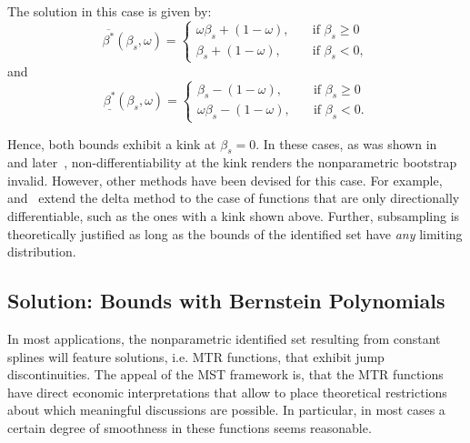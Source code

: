 \documentclass[12pt,a4paper,english]{article} %
\numberwithin{equation}{section}
\theoremstyle{definition}
\theoremstyle{remark}
\theoremstyle{plain}
\begin{document}
The solution in this case is given by:
\begin{equation}\label{eq:solution_cs_increasing_mtr_upper}
	\overline{\beta^*}(\beta_s, \omega)=
	\begin{cases}
		\omega \beta_s + (1 - \omega),& \quad \text{if } \beta_s \geq 0\\
		\beta_s + (1 - \omega),              & \quad \text{if } \beta_s < 0,
	\end{cases}
\end{equation}
and
\begin{equation}\label{eq:solution_cs_increasing_mtr_lower}
	\underline{\beta^*}(\beta_s, \omega)=
	\begin{cases}
		\beta_s - (1 - \omega),& \quad \text{if } \beta_s \geq 0\\
		\omega \beta_s - (1 - \omega),              & \quad \text{if } \beta_s < 0.
	\end{cases}
\end{equation}

Hence, both bounds exhibit a kink at $\beta_s=0$.
In these cases, as was shown in~\cite{dumbgen1993nondifferentiable} and later~\cite{fang2019infdirdiff}, non-differentiability at the kink renders the nonparametric bootstrap invalid.
However, other methods have been devised for this case. For example,~\cite{fang2019infdirdiff} and~\cite{hong2018numerical} extend the delta method to the case of functions that are only directionally differentiable, such as the ones with a kink shown above.
Further, subsampling is theoretically justified as long as the bounds of the identified set have \textit{any} limiting distribution.

\subsection{Solution: Bounds with Bernstein Polynomials}
In most applications, the nonparametric identified set resulting from constant splines will feature solutions, i.e. MTR functions, that exhibit jump discontinuities.
The appeal of the MST framework is, that the MTR functions have direct economic interpretations that allow to place theoretical restrictions about which meaningful discussions are possible.
In particular, in most cases a certain degree of smoothness in these functions seems reasonable.
\end{document}
